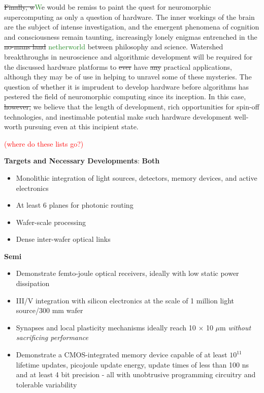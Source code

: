 \documentclass[twocolumn]{article}
\begin{document}
\sout{Finally, w}\textcolor{ForestGreen}{W}e would be remiss to paint the quest for neuromorphic supercomputing as only a question of hardware. The inner workings of the brain are the subject of intense investigation, and the emergent phenomena of cognition and consciousness remain taunting, increasingly lonely enigmas entrenched in the \sout{no-mans land} \textcolor{ForestGreen}{netherworld} between philosophy and science. Watershed breakthroughs in neuroscience and algorithmic development will be required for the discussed hardware platforms to \sout{ever} have \sout{any} practical applications, although they may be of use in helping to unravel some of these mysteries. The question of whether it is imprudent to develop hardware before algorithms has pestered the field of neuromorphic computing since its inception. In this case, \sout{however,} we believe that the length of development, rich opportunities for spin-off technologies, and inestimable potential make such hardware development well-worth pursuing even at this incipient state.  

\textcolor{red}{(where do these lists go?)}

\textbf{Targets and Necessary Developments}:
\newline
\newline
\textbf{Both}
\begin{itemize}
    \item Monolithic integration of light sources, detectors, memory devices, and active electronics
    \item At least 6 planes for photonic routing
    \item Wafer-scale processing
    \item Dense inter-wafer optical links

\end{itemize}

\textbf{Semi}
\begin{itemize}
    \item Demonstrate femto-joule optical receivers, ideally with low static power dissipation
    \item III/V integration with silicon electronics at the scale of 1 million light source/300 mm wafer
    \item Synapses and local plasticity mechanisms ideally reach 10 $\times$ 10 $\mu$m \textit{without sacrificing performance}
    \item Demonstrate a CMOS-integrated memory device capable of at least $10^{11}$ lifetime updates, picojoule update energy, update times of less than 100 ns and at least 4 bit precision - all with unobtrusive programming circuitry and tolerable variability
\end{itemize}
\end{document}
